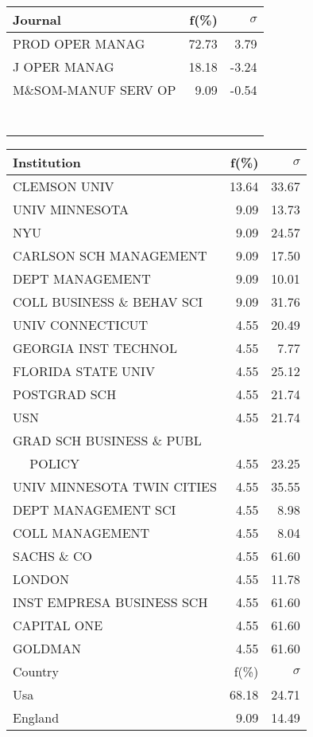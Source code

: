 \documentclass[a4paper,11pt]{report}
\begin{document}
\begin{landscape}
\begin{table}[!ht]
{\begin{tabular}{|l r  r|}
\hline
\hline
Journal & f(\%) & $\sigma$\\
\hline
PROD OPER MANAG & 72.73 & 3.79\\
J OPER MANAG & 18.18 & -3.24\\
M\&SOM-MANUF SERV OP & 9.09 & -0.54\\
 &  & \\
 &  & \\
 &  & \\
 &  & \\
 &  & \\
 &  & \\
 &  & \\
\hline
\end{tabular}
}
{\scriptsize\begin{tabular}{|l r r|}
\hline
Institution & f(\%) & $\sigma$\\
\hline
CLEMSON UNIV & 13.64 & 33.67\\
UNIV MINNESOTA & 9.09 & 13.73\\
NYU & 9.09 & 24.57\\
CARLSON SCH MANAGEMENT & 9.09 & 17.50\\
DEPT MANAGEMENT & 9.09 & 10.01\\
COLL BUSINESS \& BEHAV SCI & 9.09 & 31.76\\
UNIV CONNECTICUT & 4.55 & 20.49\\
GEORGIA INST TECHNOL & 4.55 & 7.77\\
FLORIDA STATE UNIV & 4.55 & 25.12\\
POSTGRAD SCH & 4.55 & 21.74\\
USN & 4.55 & 21.74\\
GRAD SCH BUSINESS \& PUBL &  & \\
$\quad$ POLICY & 4.55 & 23.25\\
UNIV MINNESOTA TWIN CITIES & 4.55 & 35.55\\
DEPT MANAGEMENT SCI & 4.55 & 8.98\\
COLL MANAGEMENT & 4.55 & 8.04\\
SACHS \& CO & 4.55 & 61.60\\
LONDON & 4.55 & 11.78\\
INST EMPRESA BUSINESS SCH & 4.55 & 61.60\\
CAPITAL ONE & 4.55 & 61.60\\
GOLDMAN & 4.55 & 61.60\\
\hline
\hline
Country & f(\%) & $\sigma$\\
\hline
Usa & 68.18 & 24.71\\
England & 9.09 & 14.49\\

\end{tabular}}
\end{table}
\end{landscape}
\end{document}
